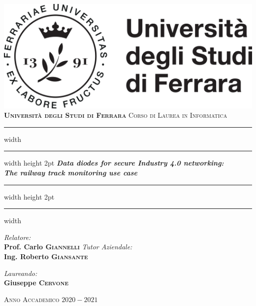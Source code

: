 \documentclass[a4paper, 12pt]{book}
\begin{document}

\begin{titlepage}
	\centering
	\includegraphics[]{logo.png}\\
	\vspace*{1cm}
	\huge \textbf{\textsc{Università degli Studi di Ferrara}}
	\Large \textsc{Corso di Laurea in Informatica}
	
	\vspace*{1.5cm}
	\hrule width \hsize \kern 1mm \hrule width \hsize height 2pt
	\vspace*{10mm}
	\Huge \emph{\textbf{Data diodes for secure Industry 4.0 networking: \\ The railway track monitoring use case}}
	\vspace*{10mm}
	\hrule width \hsize height 2pt
	\vspace*{1mm}
	\hrule width \hsize \kern 1mm
	
	\vspace*{5mm}
	\begin{minipage}{0.46\textwidth}
		\begin{flushleft} \Large
			\emph{Relatore:}\\
			\Large \textbf{Prof. Carlo \textsc{Giannelli}}
            \emph{Tutor Aziendale:}\\
			\Large \textbf{Ing. Roberto \textsc{Giansante}}
		\end{flushleft}
	\end{minipage}
	\begin{minipage}{0.45\textwidth}
		\begin{flushright} \Large
			\emph{Laureando:} \\
			\Large \textbf{Giuseppe \textsc{Cervone}}
		\end{flushright}
	\end{minipage}
	
	\vspace*{20mm}
	\Large \textsc{Anno Accademico $2020-2021$}
\end{titlepage}
\restoregeometry
\end{document}
